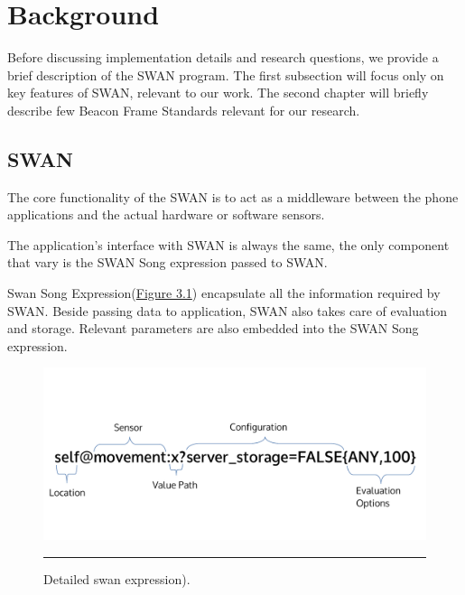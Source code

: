 
\chapter{Background} %

\label{Chapter3} %


Before discussing implementation details and research questions, we provide a brief description of the SWAN program.
The first subsection will focus only on key features of SWAN, relevant to our work.
The second chapter will briefly describe few Beacon Frame Standards relevant for our research.

\section{SWAN}
The core functionality of the SWAN is to act as a middleware between the phone applications and the actual hardware or software sensors.

The application's interface with SWAN is always the same, the only component that vary is the SWAN Song expression passed to SWAN.

Swan Song Expression(\hyperref[fig:SwanExpression]{Figure 3.1}) encapsulate all the information required by SWAN.
Beside passing data to application, SWAN also takes care of evaluation and storage. Relevant parameters are also embedded into the 
SWAN Song expression.

\begin{figure}[htbp]
  \centering
    \includegraphics[scale=0.6]{Figures/swan_expr.pdf}
    \rule{35em}{0.5pt}
  \caption[Swan Expression]{Detailed swan expression).}
  \label{fig:SwanExpression}
\end{figure}

